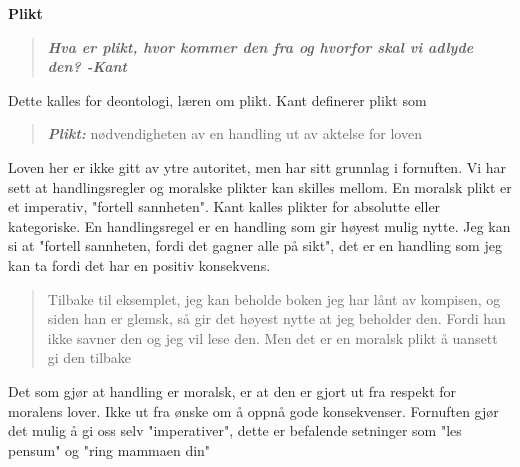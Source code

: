 \documentclass[11pt, a4paper]{article}
\newenvironment{sectionbox}[1][]{%
    \begin{sectionboxinner}
    \textbf{\large #1}
    \vspace{1pt}
    \newline
}{%
    \end{sectionboxinner}
}
\begin{document}
\begin{sectionbox}[Plikt]
\begin{flushleft}
    \begin{quote}
        \textbf{\textit{Hva er plikt, hvor kommer den fra og hvorfor skal vi adlyde den? -Kant}}
    \end{quote}
    
    Dette kalles for deontologi, læren om plikt. Kant definerer plikt som
    \begin{quote}
        \textbf{\textit{Plikt:}} nødvendigheten av en handling ut av aktelse for loven
    \end{quote}
    Loven her er ikke gitt av ytre autoritet, men har sitt grunnlag i fornuften. Vi har sett at handlingsregler og moralske plikter kan skilles mellom. En moralsk plikt er et imperativ, "fortell sannheten". Kant kalles plikter for absolutte eller kategoriske. En handlingsregel er en handling som gir høyest mulig nytte. Jeg kan si at "fortell sannheten, fordi det gagner alle på sikt", det er en handling som jeg kan ta fordi det har en positiv konsekvens. 

    \begin{quote}
        Tilbake til eksemplet, jeg kan beholde boken jeg har lånt av kompisen, og siden han er glemsk, så gir det høyest nytte at jeg beholder den. Fordi han ikke savner den og jeg vil lese den. Men det er en moralsk plikt å uansett gi den tilbake
    \end{quote}
    
    Det som gjør at handling er moralsk, er at den er gjort ut fra respekt for moralens lover. Ikke ut fra ønske om å oppnå gode konsekvenser. Fornuften gjør det mulig å gi oss selv "imperativer", dette er befalende setninger som "les pensum" og "ring mammaen din"
\end{flushleft}    
\end{sectionbox}
\end{document}
